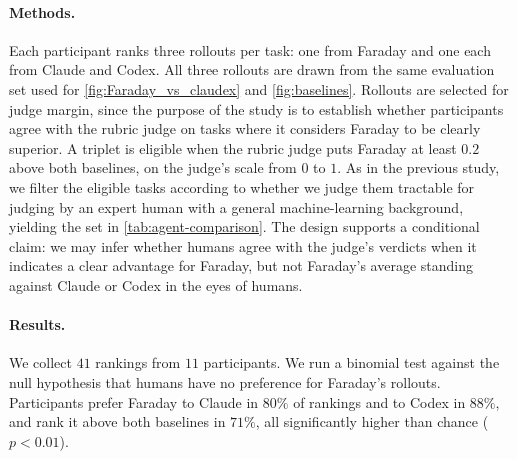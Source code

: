 \documentclass[garamond,a4paper]{inherent}
\newcommand{\faradayname}{Faraday\xspace}
\begin{document}
\paragraph{Methods.}
Each participant ranks three rollouts per task: one from \faradayname and one each from Claude and Codex.
All three rollouts are drawn from the same evaluation set used for \autoref{fig:Faraday_vs_claudex} and \autoref{fig:baselines}. 
Rollouts are selected for judge margin, since the purpose of the study is to establish whether participants agree with the rubric judge on tasks where it considers \faradayname to be clearly superior.
A triplet is eligible when the rubric judge puts \faradayname at least $0.2$ above both baselines, on the judge's scale from $0$ to $1$.
As in the previous study, we filter the eligible tasks according to whether we judge them tractable for judging by an expert human with a general machine-learning background, yielding the set in \autoref{tab:agent-comparison}.
The design supports a conditional claim: we may infer whether humans agree with the judge's verdicts when it indicates a clear advantage for \faradayname, but not \faradayname's average standing against Claude or Codex in the eyes of humans.

\paragraph{Results.}
We collect $41$ rankings from $11$ participants. We run a binomial test against the null hypothesis that humans have no preference for \faradayname's rollouts. Participants prefer \faradayname{} to Claude in $80\%$ of rankings and to Codex in $88\%$, and rank it above both baselines in $71\%$, all significantly higher than chance ($p < 0.01$).
\end{document}
